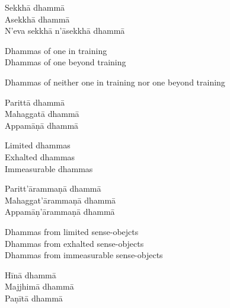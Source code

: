 \begin{pali-hang-continued}
  Sekkhā dhammā\\
  Asekkhā dhammā\\
  N'eva sekkhā n'āsekkhā dhammā
\end{pali-hang-continued}

\begin{english-verses}
  Dhammas of one in training\\
  Dhammas of one beyond training\\
  \begin{english-hang-together-verses}
  Dhammas of neither one in training nor one beyond training
  \end{english-hang-together-verses}
\end{english-verses}

\ifbfive\clearpage\fi

\begin{pali-hang-continued}
  Parittā dhammā\\
  Mahaggatā dhammā\\
  Appamāṇā dhammā
\end{pali-hang-continued}

\ifafive\clearpage\fi

\begin{english-verses}
  Limited dhammas\\
  Exhalted dhammas\\
  Immeasurable dhammas
\end{english-verses}

\ifninebythirteen\clearpage\fi

\begin{pali-hang-continued}
  Paritt'ārammaṇā dhammā\\
  Mahaggat'ārammaṇā dhammā\\
  Appamāṇ'ārammaṇā dhammā
\end{pali-hang-continued}

\begin{english-verses}
  Dhammas from limited sense-obejcts\\
  Dhammas from exhalted sense-objects\\
  Dhammas from immeasurable sense-objects
\end{english-verses}

\begin{pali-hang-continued}
  Hīnā dhammā\\
  Majjhimā dhammā\\
  Paṇītā dhammā
\end{pali-hang-continued}

